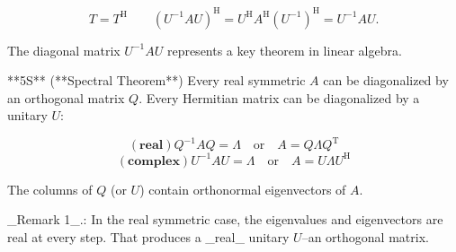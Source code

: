 \[T=T^{\mathrm{H}}\qquad(U^{-1}AU)^{\mathrm{H}}=U^{\mathrm{H}}A^{\mathrm{H}}(U^ {-1})^{\mathrm{H}}=U^{-1}AU.\]

The diagonal matrix \(U^{-1}AU\) represents a key theorem in linear algebra.

**5S** (**Spectral Theorem**) Every real symmetric \(A\) can be diagonalized by an orthogonal matrix \(Q\). Every Hermitian matrix can be diagonalized by a unitary \(U\):

\[(\textbf{real}) Q^{-1}AQ=\Lambda\quad\text{or}\quad A=Q\Lambda Q^{\mathrm{T}}\] \[(\textbf{complex}) U^{-1}AU=\Lambda\quad\text{or}\quad A=U\Lambda U^{\mathrm{H}}\]

The columns of \(Q\) (or \(U\)) contain orthonormal eigenvectors of \(A\).

_Remark 1_.: In the real symmetric case, the eigenvalues and eigenvectors are real at every step. That produces a _real_ unitary \(U\)--an orthogonal matrix.

 